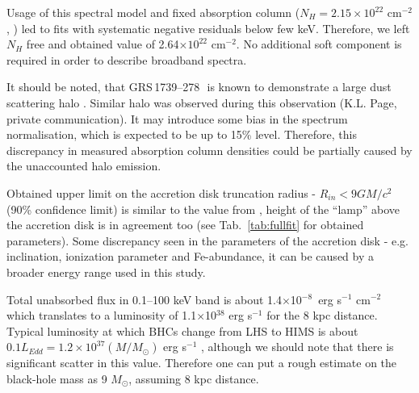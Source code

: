 \documentclass[a4paper,fleqn,usenatbib]{mnras}
\def\grs{{GRS\,1739--278\,}}
\begin{document}
Usage of this spectral model and fixed absorption column ($N_{H} = 2.15\times10^{22}$ cm$^{-2}$, \citep{fuerst16_gx339}) led to fits with systematic negative residuals below few keV. 
Therefore, we left $N_{H}$ free and obtained value of 2.64$\times10^{22}$ cm$^{-2}$. 
No additional soft component is required in order to describe broadband spectra.

It should be noted, that \grs\, is known to demonstrate a large dust scattering halo \citep{greiner96}. 
Similar halo was observed during this observation (K.L. Page, private communication). 
It may introduce some bias in the spectrum normalisation, which is expected to be up to 15\% level. 
Therefore, this discrepancy in measured absorption column densities could be partially caused by the unaccounted halo emission.

Obtained upper limit on the accretion disk truncation radius - $R_{in} < 9 GM/c^{2}$ (90\% confidence limit) is similar to the value from \cite{miller15_nust}, height of the ``lamp'' above the accretion disk is in agreement too (see Tab.~\ref{tab:fullfit} for obtained parameters). 
Some discrepancy seen in the parameters of the accretion disk - e.g. inclination, ionization parameter and Fe-abundance, it can be caused by a broader energy range used in this study. 

Total unabsorbed flux in 0.1--100 keV band is about 1.4$\times$10$^{-8}$~erg s$^{-1}$ cm$^{-2}$ which translates to a luminosity of 1.1$\times$10$^{38}$ erg s$^{-1}$ for the 8 kpc distance. 
Typical luminosity at which BHCs change from LHS to HIMS is about $0.1 L_{Edd} = 1.2\times10^{37} (M/M_{\odot})$ erg s$^{-1}$ \citep{2010MNRAS.403...61D}, although we should note that there is significant scatter in this value. 
Therefore one can put a rough estimate on the black-hole mass as 9 $M_{\odot}$, assuming 8 kpc distance.
\end{document}
